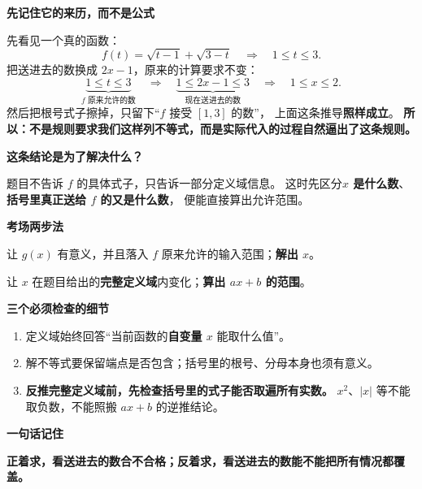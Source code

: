 \clearpage
\begin{summarybox}
\textbf{\textcolor{CSummary}{先记住它的来历，而不是公式}}

先看见一个真的函数：
\[
 f(t)=\sqrt{t-1}+\sqrt{3-t}
 \quad\Longrightarrow\quad1\le t\le3.
\]
把送进去的数换成 $2x-1$，原来的计算要求不变：
\[
 \underbrace{1\le t\le3}_{f\text{ 原来允许的数}}
 \quad\Longrightarrow\quad
 \underbrace{1\le2x-1\le3}_{\text{现在送进去的数}}
 \quad\Longrightarrow\quad\boxed{1\le x\le2}.
\]
然后把根号式子擦掉，只留下“$f$ 接受 $[1,3]$ 的数”，
上面这条推导\textbf{照样成立}。
\textbf{所以：不是规则要求我们这样列不等式，而是实际代入的过程自然逼出了这条规则。}

\medskip

\textbf{\textcolor{CSummary}{这条结论是为了解决什么？}}

题目不告诉 $f$ 的具体式子，只告诉一部分定义域信息。
这时先区分\textbf{$x$ 是什么数}、\textbf{括号里真正送给 $f$ 的又是什么数}，
便能直接算出允许范围。

\medskip
\textbf{\textcolor{CSummary}{考场两步法}}
\begin{description}[style=nextline,leftmargin=2.8em,labelsep=0.5em,itemsep=0.4em]
 \item[\textbf{已知 $f(t)$，求 $f[g(x)]$：}]
 让 $g(x)$ 有意义，并且落入 $f$ 原来允许的输入范围；\textbf{解出 $x$}。
 \item[\textbf{已知 $f(ax+b)$，求 $f(t)$（$a\ne0$）：}]
 让 $x$ 在题目给出的\textbf{完整定义域}内变化；\textbf{算出 $ax+b$ 的范围}。
\end{description}

\textbf{\textcolor{CSummary}{三个必须检查的细节}}
\begin{enumerate}[leftmargin=*,itemsep=0.25em]
 \item 定义域始终回答“当前函数的\textbf{自变量 $x$} 能取什么值”。
 \item 解不等式要保留端点是否包含；括号里的根号、分母本身也须有意义。
 \item \textbf{反推完整定义域前，先检查括号里的式子能否取遍所有实数。}
 $x^2$、$|x|$ 等不能取负数，不能照搬 $ax+b$ 的逆推结论。
\end{enumerate}

\medskip
\textbf{\textcolor{CSummary}{一句话记住}}

\textbf{正着求，看送进去的数合不合格；反着求，看送进去的数能不能把所有情况都覆盖。}
\end{summarybox}
